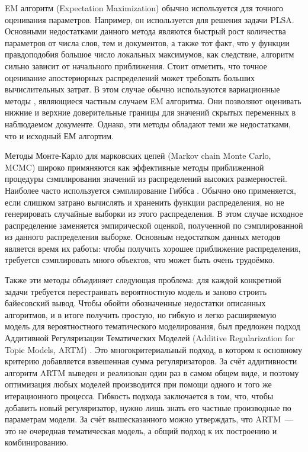 \documentclass[12pt, twoside]{article}
\begin{document}
EM алгоритм (Expectation Maximization) \cite{bilmes1998gentle} обычно используется для  точного оценивания параметров. Например, он используется для решения задачи PLSA. Основными недостатками данного метода являются быстрый рост количества параметров от числа слов, тем и документов, а также тот факт, что у функции правдоподобия большое число локальных максимумов, как следствие, алгоритм сильно зависит от начального приближения. Стоит отметить, что точное оценивание апостериорных распределений может требовать больших вычислительных затрат. В этом случае обычно используются вариационные методы \cite{jordan1999introduction}, являющиеся частным случаем EM алгоритма. Они  позволяют оценивать нижние и верхние доверительные границы для значений скрытых переменных в наблюдаемом документе. Однако, эти методы обладают теми же недостатками, что и исходный ЕМ алгортим.

Методы Монте-Карло для марковских цепей (Markov chain Monte Carlo, MCMC) \cite{gilks1996introducing,andrieu2003introduction} широко примяняются как эффективные методы приближенной процедуры сэмплирования значений из распределений высоких размерностей. Наиболее часто используется сэмплирование Гиббса \cite{griffiths2004finding}.  Обычно оно применяется, если слишком затрано вычислять и храненить функции распределения,  но не генерировать случайные выборки из этого распределения. В этом случае исходное распределение заменяется эмпирической оценкой, полученной по  сэмплированной из данного распределения выборке. Основным недостатком данных методов является время их работы: чтобы получить хорошее приближение распределения, требуется сэмплировать много объектов, что может быть очень трудоёмко. 

Также эти методы объединяет следующая проблема:  для каждой конкретной задачи требуется перестраивать вероятностную модель и заново строить байесовский вывод. Чтобы обойти обозначенные недостатки описанных алгоритмов, и в итоге получить простую, но гибкую и легко расширяемую модель для вероятностного тематического моделирования, был предложен подход Аддитивной Регуляризации Тематических Моделей (Additive Regularization for Topic Models, ARTM) \cite{vorontsov2014additive,vorontsov2014tutorial,vorontsov2015additive}. Это многокритериальный подход, в котором к основному критерию добавляется взвешенная сумма регуляризаторов. За счёт аддитивности алгоритм ARTM  выведен и реализован один раз в самом общем виде, и поэтому оптимизация любых моделей  производится при помощи одного и того же итерационного процесса. Гибкость подхода заключается в том, что, чтобы добавить новый регуляризатор, нужно лишь знать его частные производные по параметрам модели. За счёт вышесказанного можно утверждать, что ARTM~---  это не очередная тематическая модель, а общий подход к их  построению и комбинированию. 
\end{document}
